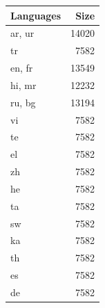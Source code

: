 \begin{figure}[ht]
    \centering
    
    \begin{subtable}{0.49\textwidth}
        \centering
        \begin{tabular}{lr}
            \toprule
            Languages & Size \\
            \midrule
            ar, ur & 14020 \\
            tr & 7582 \\
            en, fr & 13549 \\
            hi, mr & 12232 \\
            ru, bg & 13194 \\
            vi & 7582 \\
            te & 7582 \\
            el & 7582 \\
            zh & 7582 \\
            he & 7582 \\
            ta & 7582 \\
            sw & 7582 \\
            ka & 7582 \\
            th & 7582 \\
            es & 7582 \\
            de & 7582 \\
            \bottomrule
        \end{tabular}
        \caption{\citet{chung_improving_2020}}
        \label{tab:chung_clusters_k4}
        


\end{subtable}
\end{figure}
